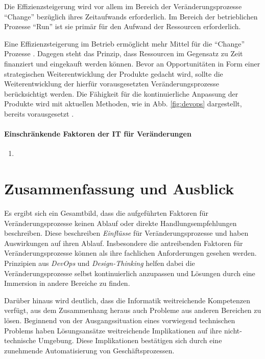\begin{enumerate}
    Die Effizienzsteigerung wird vor allem im Bereich der Veränderungsprozesse \enquote{Change} bezüglich ihres Zeitaufwands erforderlich. Im Bereich der betrieblichen Prozesse \enquote{Run} ist sie primär für den Aufwand der Ressourcen erforderlich.
    
    Eine Effizienzsteigerung im Betrieb ermöglicht mehr Mittel für die \enquote{Change} Prozesse \cite{Rausch2006}. Dagegen steht das Prinzip, dass Ressourcen im Gegensatz zu Zeit finanziert und eingekauft werden können. Bevor an Opportunitäten in Form einer strategischen Weiterentwicklung der Produkte \cite{Rausch2006} gedacht wird, sollte die Weiterentwicklung der hierfür vorausgesetzten Veränderungsprozesse berücksichtigt werden. Die Fähigkeit für die kontinuierliche Anpassung \cite{Bussmann2006, Ganswindt2006} der Produkte wird mit aktuellen Methoden, wie in Abb. \ref{fig:devops} dargestellt, bereits vorausgesetzt \cite{Alt2017}.

\end{enumerate}

\paragraph{Einschränkende Faktoren der IT für Veränderungen}
\begin{enumerate}
    \item 
\end{enumerate}


\section{Zusammenfassung und Ausblick}
Es ergibt sich ein Gesamtbild, dass die aufgeführten Faktoren für Veränderungsprozesse keinen Ablauf oder direkte Handlungsempfehlungen beschreiben. Diese beschreiben \emph{Einflüsse} für Veränderungsprozesse und haben Auswirkungen auf ihren Ablauf. Insbesondere die antreibenden Faktoren für Veränderungsprozesse können als ihre fachlichen Anforderungen gesehen werden. Prinzipien aus \emph{DevOps} und \emph{Design-Thinking} helfen dabei die Veränderungsprozesse selbst kontinuierlich anzupassen und Lösungen durch eine Immersion in andere Bereiche zu finden. 

Darüber hinaus wird deutlich, dass die Informatik weitreichende Kompetenzen verfügt, aus dem Zusammenhang heraus auch Probleme aus anderen Bereichen zu lösen. Beginnend von der Ausgangssituation eines vorwiegend technischen Problems haben Lösungsansätze weitreichende Implikationen auf ihre nicht-technische Umgebung. Diese Implikationen bestätigen sich durch eine zunehmende Automatisierung von Geschäftsprozessen.

